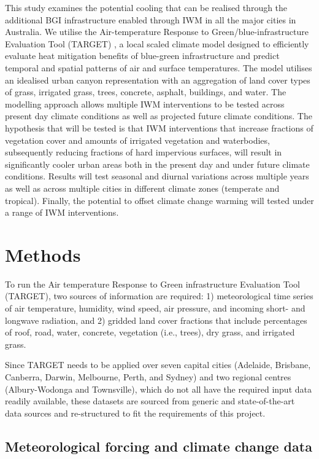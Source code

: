 \documentclass[utf8]{frontiersSCNS} %
\begin{document}
This study examines the potential cooling that can be realised through the additional BGI infrastructure enabled through IWM in all the major cities in Australia. We utilise the Air-temperature Response to Green/blue-infrastructure Evaluation Tool (TARGET) \citep{Broadbent2019}, a local scaled climate model designed to efficiently evaluate heat mitigation benefits of blue-green infrastructure and predict temporal and spatial patterns of air and surface temperatures. The model utilises an idealised urban canyon representation with an aggregation of land cover types of grass, irrigated grass, trees, concrete, asphalt, buildings, and water. The modelling approach allows multiple IWM interventions to be tested across present day climate conditions as well as projected future climate conditions. The hypothesis that will be tested is that IWM interventions that increase fractions of vegetation cover and amounts of irrigated vegetation and waterbodies, subsequently reducing fractions of hard impervious surfaces, will result in significantly cooler urban areas both in the present day and under future climate conditions. Results will test seasonal and diurnal variations across multiple years as well as across multiple cities in different climate zones (temperate and tropical). Finally, the potential to offset climate change warming will tested under a range of IWM interventions.


\section{Methods}\label{sec:methods}


To run the Air temperature Response to Green infrastructure Evaluation Tool (TARGET), two sources of information are required: 1) meteorological time series of air temperature, humidity, wind speed, air pressure, and incoming short- and longwave radiation, and 2) gridded land cover fractions that include percentages of roof, road, water, concrete, vegetation (i.e., trees), dry grass, and irrigated grass. 

Since TARGET needs to be applied over seven capital cities (Adelaide, Brisbane, Canberra, Darwin, Melbourne, Perth, and Sydney) and two regional centres (Albury-Wodonga and Townsville), which do not all have the required input data readily available, these datasets are sourced from generic and state-of-the-art data sources and re-structured to fit the requirements of this project. 

\subsection{Meteorological forcing and climate change data}\label{sec:forcing}
\end{document}
